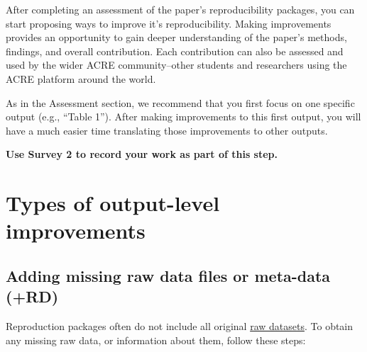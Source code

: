 \documentclass[]{book}
\begin{document}
After completing an assessment of the paper's reproducibility packages, you can start proposing ways to improve it's reproducibility. Making improvements provides an opportunity to gain deeper understanding of the paper's methods, findings, and overall contribution. Each contribution can also be assessed and used by the wider ACRE community--other students and researchers using the ACRE platform around the world.

As in the Assessment section, we recommend that you first focus on one specific output (e.g., ``Table 1''). After making improvements to this first output, you will have a much easier time translating those improvements to other outputs.

\textbf{Use Survey 2 to record your work as part of this step.}

\hypertarget{types-of-output-level-improvements}{%
\section{Types of output-level improvements}\label{types-of-output-level-improvements}}

\hypertarget{rd}{%
\subsection{Adding missing raw data files or meta-data (+RD)}\label{rd}}

Reproduction packages often do not include all original \protect\hyperlink{describe-inputs}{raw datasets}. To obtain any missing raw data, or information about them, follow these steps:
\end{document}
